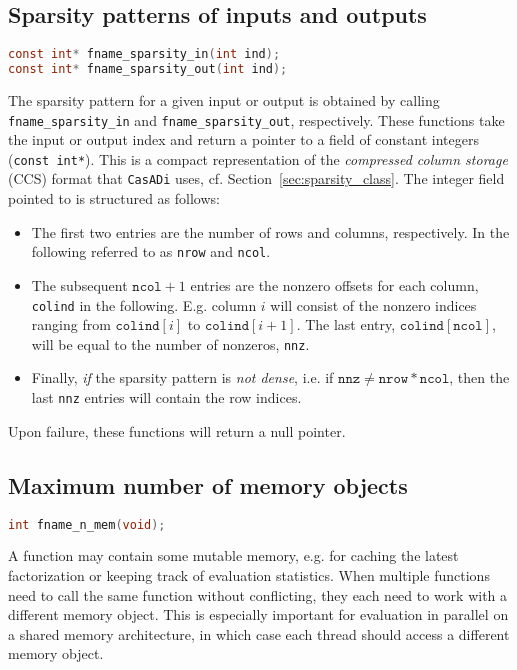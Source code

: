 \documentclass[a4paper,12pt]{book}
\newcommand{\CasADi}{\texttt{CasADi}\xspace}
\begin{document}
\subsection*{Sparsity patterns of inputs and outputs}
\begin{lstlisting}[language=C]
const int* fname_sparsity_in(int ind);
const int* fname_sparsity_out(int ind);
\end{lstlisting}

The sparsity pattern for a given input or output is obtained by calling
\verb|fname_sparsity_in| and \verb|fname_sparsity_out|, respectively.
These functions take the input or output index and return a pointer to a field
of constant integers (\verb|const int*|). This is a compact representation
of the \emph{compressed column storage} (CCS) format that \CasADi uses,
cf. Section~\ref{sec:sparsity_class}.
The integer field pointed to is structured as follows:

\begin{itemize}
  \item The first two entries are the number of rows and columns, respectively.
  In the following referred to as \texttt{nrow} and \texttt{ncol}.
  \item The subsequent $\texttt{ncol}+1$ entries are the nonzero offsets
  for each column, \texttt{colind} in the following. E.g. column $i$ will consist
  of the nonzero indices ranging from $\texttt{colind}[i]$ to $\texttt{colind}[i+1]$.
  The last entry, $\texttt{colind}[\texttt{ncol}]$, will be equal to the number
  of nonzeros, \texttt{nnz}.
  \item Finally, \emph{if} the sparsity pattern is \emph{not dense}, i.e. if
  $\texttt{nnz} \ne \texttt{nrow}*\texttt{ncol}$, then the last \texttt{nnz}
  entries will contain the row indices.
\end{itemize}

Upon failure, these functions will return a null pointer.

\subsection*{Maximum number of memory objects}
\begin{lstlisting}[language=C]
int fname_n_mem(void);
\end{lstlisting}

A function may contain some mutable memory, e.g. for caching the latest
factorization or keeping track of evaluation statistics. When multiple functions
need to call the same function without conflicting, they each need to work with
a different memory object. This is especially important for evaluation in
parallel on a shared memory architecture, in which case each thread should access
a different memory object.
\end{document}
